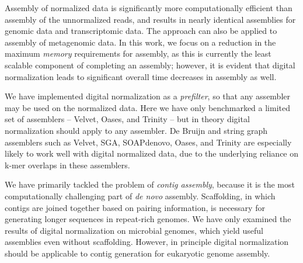 \documentclass{pnastwo}
\begin{document}
\begin{article}
Assembly of normalized data is significantly more computationally
efficient than assembly of the unnormalized reads, and results in nearly
identical assemblies for genomic data and transcriptomic data.  The
approach can also be applied to assembly of metagenomic data.  In this
work, we focus on a reduction in the maximum {\em memory} requirements
for assembly, as this is currently the least scalable component of
completing an assembly; however, it is evident that digital
normalization leads to significant overall time decreases in
assembly as well.

We have implemented digital normalization as a {\em prefilter}, so
that any assembler may be used on the normalized data.  Here we have
only benchmarked a limited set of assemblers -- Velvet, Oases, and
Trinity -- but in theory digital normalization should apply to any
assembler.  De Bruijn and string graph assemblers such as Velvet, SGA,
SOAPdenovo, Oases, and Trinity are especially likely to work well with
digital normalized data, due to the underlying reliance on k-mer
overlaps in these assemblers.


We have primarily tackled the problem of {\em contig assembly},
because it is the most computationally challenging part of {\em de
  novo} assembly.  Scaffolding, in which contigs are joined together
based on pairing information, is necessary for generating longer
sequences in repeat-rich genomes.  We have only examined the results
of digital normalization on microbial genomes, which yield useful
assemblies even without scaffolding.  However, in principle digital
normalization should be applicable to contig generation for eukaryotic
genome assembly.


\end{article}
\end{document}
